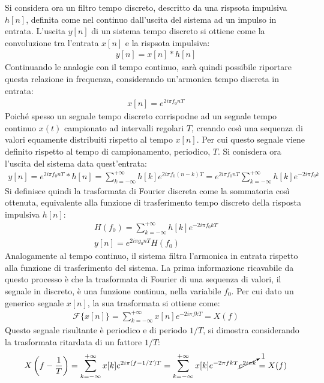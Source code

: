 \documentclass{article}
\numberwithin{equation}{subsection}
\begin{document}
Si considera ora un filtro tempo discreto, descritto da una rispsota impulsiva $h[n]$, definita come nel continuo dall'uscita del sistema ad un impulso in entrata. L'uscita 
$y[n]$ di un sistema tempo discreto si ottiene come la convoluzione tra l'entrata $x[n]$ e la rispsota impulsiva:
\begin{gather*}
    y[n]=x[n]*h[n]
\end{gather*}
Continuando le analogie con il tempo continuo, sarà quindi possibile riportare questa relazione in frequenza, considerando un'armonica tempo discreta in entrata:
\begin{gather*}
    x[n]=e^{2i\pi f_0nT}
\end{gather*}
Poiché spesso un segnale tempo discreto corrispodne ad un segnale tempo continuo $x(t)$ campionato ad intervalli regolari $T$, creando così una sequenza di valori equamente 
distribuiti rispetto al tempo $x[n]$. Per cui questo segnale viene definito rispetto al tempo di campionamento, periodico, $T$. Si conisdera ora l'uscita del sistema 
data quest'entrata:
\begin{gather*}
    y[n]=e^{2i\pi f_0nT}*h[n]=\displaystyle\sum_{k=-\infty}^{+\infty}h[k]e^{2i\pi f_0(n-k)T}=e^{2i\pi f_0nT}\displaystyle\sum_{k=-\infty}^{+\infty}h[k]e^{-2i\pi f_0k}
\end{gather*}
Si definisce quindi la trasformata di Fourier discreta come la sommatoria così ottenuta, equivalente alla funzione di trasferimento tempo discreto della risposta 
impulsiva $h[n]$:
\begin{gather*}
    H(f_0)=\displaystyle\sum_{k=-\infty}^{+\infty}h[k]e^{-2i\pi f_0kT}\\
    y[n]=e^{2i\pi g_0nT}H(f_0)
\end{gather*}
Analogamente al tempo continuo, il sistema filtra l'armonica in entrata rispetto alla funzione di trasferimento del sistema. 
La prima informazione ricavabile da questo processo è che la trasformata di Fourier di una sequenza di valori, il segnale in discreto, è una funzione continua, nella 
variabile $f_0$. Per cui dato un generico segnale $x[n]$, la sua trasformata si ottiene come:
\begin{gather*}
    \mathscr{F}\{x[n]\}=\displaystyle\sum_{k=-\infty}^{+\infty}x[n]e^{-2i\pi fkT}=X(f)
\end{gather*}
Questo segnale risultante è periodico e di periodo $1/T$, si dimostra considerando la trasformata ritardata di un fattore $1/T$:
\begin{gather*}
    X\left(\displaystyle f-\frac{1}{T}\right)=\displaystyle\sum_{k=-\infty}^{+\infty}x[k]e^{2i\pi (f-1/T)T}=\displaystyle\sum_{k=-\infty}^{+\infty}x[k]e^{-2\pi fkT}\cancelto{1}{e^{2i\pi k}}=X(f)
\end{gather*}
\end{document}
